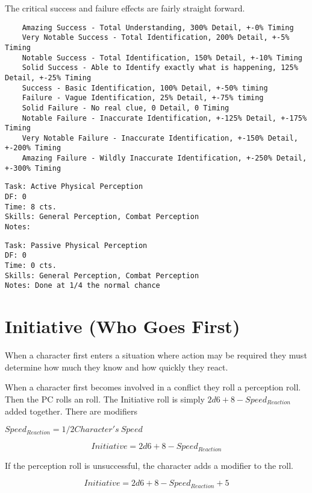 The critical success and failure effects are fairly straight forward. 

\begin{verbatim}
	Amazing Success - Total Understanding, 300% Detail, +-0% Timing
	Very Notable Success - Total Identification, 200% Detail, +-5% Timing
    Notable Success - Total Identification, 150% Detail, +-10% Timing
	Solid Success - Able to Identify exactly what is happening, 125% Detail, +-25% Timing
	Success - Basic Identification, 100% Detail, +-50% timing
	Failure - Vague Identification, 25% Detail, +-75% timing
	Solid Failure - No real clue, 0 Detail, 0 Timing
	Notable Failure - Inaccurate Identification, +-125% Detail, +-175% Timing
	Very Notable Failure - Inaccurate Identification, +-150% Detail, +-200% Timing
	Amazing Failure - Wildly Inaccurate Identification, +-250% Detail, +-300% Timing
\end{verbatim}

\begin{verbatim}
Task: Active Physical Perception  
DF: 0 
Time: 8 cts. 
Skills: General Perception, Combat Perception
Notes: 
\end{verbatim}

\begin{verbatim}
Task: Passive Physical Perception  
DF: 0 
Time: 0 cts. 
Skills: General Perception, Combat Perception
Notes: Done at 1/4 the normal chance 
\end{verbatim}



\section{Initiative (Who Goes First)}

When a character first enters a situation where action may be required they must determine 
how much they know and how quickly they react.

When a character first becomes involved in a conflict they roll a perception roll. Then the PC rolls an  roll. The 
Initiative roll is simply $ 2d6 + 8 - Speed_{Reaction} $ added together. There are modifiers 

$ Speed_{Reaction} = 1/2 {Character's\ Speed } $

\[{Initiative} = 2d6 + 8 - Speed_{Reaction}\]

If the perception roll is unsuccessful, the character adds a modifier 
to the roll. 

\[{Initiative} = 2d6 + 8 - Speed_{Reaction} + 5\]

